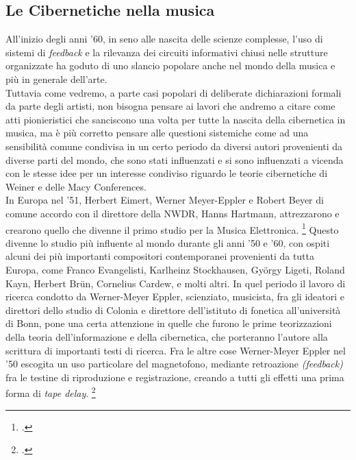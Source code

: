 \subsection{Le Cibernetiche nella musica}
\label{sec:Le cibernetiche nella musica}
All'inizio degli anni '60, in seno alle nascita delle scienze complesse,
l'uso di sistemi di \emph{feedback}  e la rilevanza dei circuiti informativi chiusi
nelle strutture organizzate
ha goduto di uno slancio popolare anche nel mondo della musica
e più in generale dell'arte. \\
Tuttavia come vedremo, a parte casi popolari di deliberate dichiarazioni
formali da parte degli artisti, non bisogna pensare ai lavori che andremo a citare
come atti pionieristici che sanciscono una volta per tutte la nascita della cibernetica in musica,
ma è più corretto pensare alle questioni sistemiche come ad una sensibilità
comune condivisa in un certo periodo da diversi autori provenienti da diverse parti del mondo,
che sono stati influenzati e si sono influenzati a vicenda
con le stesse idee per un interesse condiviso riguardo
le teorie cibernetiche di Weiner e delle Macy Conferences. \\
In Europa nel '51, Herbert Eimert, Werner Meyer-Eppler e Robert Beyer
di comune accordo con il direttore della NWDR, Hanns Hartmann,
attrezzarono e crearono quello che divenne il primo studio per la Musica Elettronica. 
\footcite{discipiocircuitideltempo}
Questo divenne lo studio più influente al mondo durante gli anni '50 e '60,
con ospiti alcuni dei più importanti compositori contemporanei provenienti da tutta Europa,
come Franco Evangelisti, Karlheinz Stockhausen, György Ligeti, Roland Kayn, Herbert Brün,
Cornelius Cardew, e molti altri.
In quel periodo il lavoro di ricerca condotto da Werner-Meyer Eppler,
scienziato, musicista, fra gli ideatori e direttori dello studio di Colonia e
direttore dell'istituto di fonetica all'università di Bonn,
pone una certa attenzione in quelle che furono le prime
teorizzazioni della teoria dell'informazione e della cibernetica,
che porteranno l'autore alla scrittura di importanti testi di ricerca.
Fra le altre cose Werner-Meyer Eppler nel '50 escogita un uso particolare
del magnetofono, mediante retroazione \textit{(feedback)} fra le testine di riproduzione e 
registrazione, creando a tutti gli effetti una prima forma di \textit{tape delay}. \footcite{discipiocircuitideltempo}
